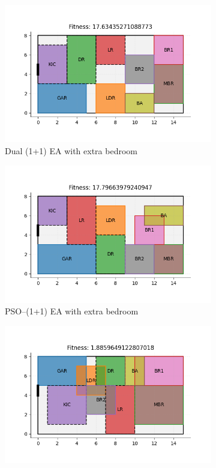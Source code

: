 \documentclass[]{article}
\begin{document}
\begin{figure}[ht]
    \centering
    \begin{subfigure}[b]{0.8\textwidth}
        \includegraphics[width=\textwidth]{images/2bed_best_dual_1plus1ea.png}
        \caption{Dual (1+1) EA with extra bedroom}
    \end{subfigure}
    \hfill
    \begin{subfigure}[b]{0.8\textwidth}
        \includegraphics[width=\textwidth]{images/2bed_best_pso_1plus1ea.png}
        \caption{PSO--(1+1) EA with extra bedroom}
    \end{subfigure}
    \hfill
    \begin{subfigure}[b]{0.8\textwidth}
        \includegraphics[width=\textwidth]{images/2bed_best_pso_mcts.png}

\end{subfigure}
\end{figure}
\end{document}
